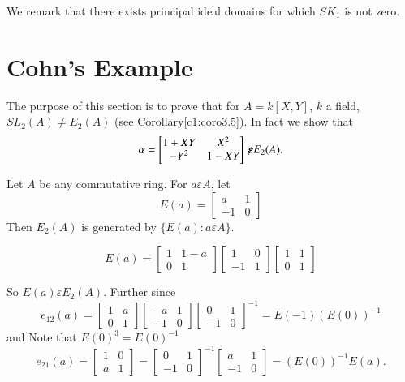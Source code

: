 We remark that there exists principal ideal domains for which $SK_1$
is not zero.



\section{Cohn's Example}\label{c1:s3}

The purpose of this section is to prove that for $A=k[X,Y]$, $k$ a
field, $SL_2(A)\neq E_2(A)$ (see Corollary\ref{c1:coro3.5}). In fact we
show that 
$$
\alpha=
\begin{bmatrix}
1+XY & X^{2}\\
-Y^{2} & 1-XY
\end{bmatrix} \not\kern-2pt\varepsilon E_2(A).
$$

\begin{lem}\label{c1:lem3.1}
Let $A$ be any commutative ring. For $a\varepsilon A$, let 
$$
E(a)=
\begin{bmatrix}
a & 1\\
-1 & 0
\end{bmatrix}
$$
Then $E_2(A)$ is generated by $\{E(a): a\varepsilon A\}$.

$$
E(a)=
\begin{bmatrix}
1 & 1-a\\
0 & 1
\end{bmatrix} \begin{bmatrix}
1 & 0\\
-1 & 1
\end{bmatrix} \begin{bmatrix}
1 & 1\\
0 & 1
\end{bmatrix}
$$

So $E(a)\varepsilon E_2(A)$. Further since
$$
e_{12}(a)=
\begin{bmatrix}
1 & a\\
0 &1
\end{bmatrix} \begin{bmatrix}
-a & 1\\
-1 & 0
\end{bmatrix} \begin{bmatrix}
0 & 1\\
-1 & 0
\end{bmatrix}^{-1}=E(-1)(E(0))^{-1} 
$$
and Note that $E(0)^{3}=E(0)^{-1}$
$$
e_{21}(a)=
\begin{bmatrix}
1 & 0\\
a & 1
\end{bmatrix} =\begin{bmatrix}
0 & 1\\
-1 & 0
\end{bmatrix}^{-1} \begin{bmatrix}
a & 1\\
-1 & 0
\end{bmatrix} = (E(0))^{-1}E(a).
$$
\end{lem}

